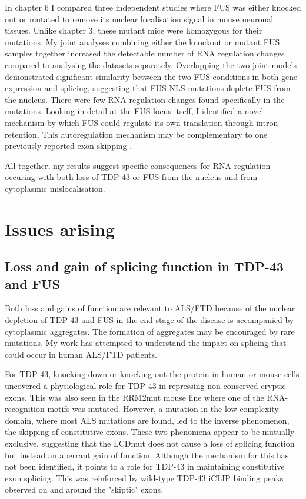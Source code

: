 In chapter 6 I compared three independent studies where FUS was either knocked out or mutated to remove its nuclear localisation signal in mouse neuronal tissues.
Unlike chapter 3, these mutant mice were homozygous for their mutations.
My joint analyses combining either the knockout or mutant FUS samples together increased the detectable number of RNA regulation changes compared to analysing the datasets separately.
Overlapping the two joint models demonstrated significant similarity between the two FUS conditions in both gene expression and splicing, suggesting that FUS NLS mutations deplete FUS from the nucleus.
There were few RNA regulation changes found specifically in the mutations.
Looking in detail at the FUS locus itself, I identified a novel mechanism by which FUS could regulate its own translation through intron retention. 
This autoregulation mechanism may be complementary to one previously reported exon skipping \citep{Zhou2013}.

All together, my results suggest specific consequences for RNA regulation occuring with both loss of TDP-43 or FUS from the nucleus and from cytoplasmic mislocalisation.

\section{Issues arising}

\subsection{Loss and gain of splicing function in TDP-43 and FUS}

Both loss and gains of function are relevant to ALS/FTD because of the nuclear depletion of TDP-43 and FUS in the end-stage of the disease  is accompanied by cytoplasmic aggregates.
The formation of aggregates may be encouraged by rare mutations.
My work has attempted to understand the impact on splicing that could occur in human ALS/FTD patients.

For TDP-43, knocking down or knocking out the protein in human or mouse cells uncovered a physiological role for TDP-43 in repressing non-conserved cryptic exons. 
This was also seen in the RRM2mut mouse line where one of the RNA-recognition motifs was mutated.
However, a mutation in the low-complexity domain, where most ALS mutations are found, led to the inverse phenomenon, the skipping of constitutive exons.
These two phenomena appear to be mutually exclusive, suggesting that the LCDmut does not cause a loss of splicing function but instead an aberrant gain of function.
Although the mechanism for this has not been identified, it points to a role for TDP-43 in maintaining constitutive exon splicing.
This was reinforced by wild-type TDP-43 iCLIP binding peaks observed on and around the "skiptic" exons.

